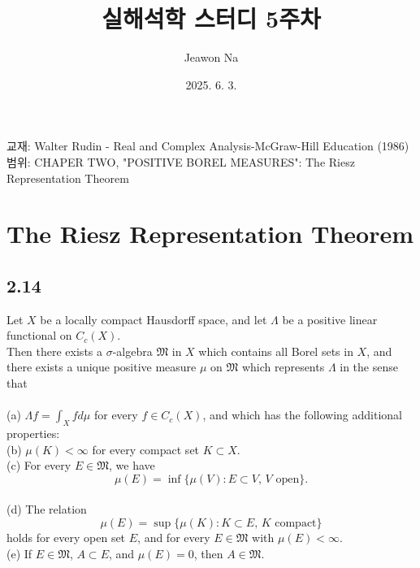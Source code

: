 \documentclass[11pt,reqno]{amsart}
\renewcommand{\(}{\left(}
\renewcommand{\)}{\right)}
\renewcommand{\[}{\left[}
\renewcommand{\]}{\right]}
\newenvironment{textbox}
  {\begin{tcolorbox}[
    colback=gray!10, 
    colframe=gray!50, 
    boxrule=0.5pt,
    fontupper=\normalfont
  ]}
  {\end{tcolorbox}}
\newcommand{\M}{\mathfrak{M}}
\begin{document}
\title[]{실해석학 스터디 5주차}
\author{Jeawon Na}
\date{2025. 6. 3.}

\maketitle

\vspace{0.5em}

교재: Walter Rudin - Real and Complex Analysis-McGraw-Hill Education (1986) \\
범위: CHAPER TWO, "POSITIVE BOREL MEASURES": The Riesz Representation Theorem

\section{The Riesz Representation Theorem}

\subsection{2.14}

\begin{textbox}
  Let $X$ be a locally compact Hausdorff space, and let $\Lambda$ be a positive linear functional on $C_c(X)$. \\
  Then there exists a $\sigma$-algebra $\M$ in $X$ which contains all Borel sets in $X$, 
  and there exists a unique positive measure $\mu$ on $\M$ which represents $\Lambda$ in the sense that \\ \\
  (a) $\Lambda f = \int_X f d \mu$ for every $f \in C_c(X)$, and which has the following additional properties: \\
  (b) $\mu(K) < \infty$ for every compact set $K \subset X$. \\
  (c) For every $E \in \M$, we have 
  \begin{equation*}
    \mu(E) = \inf \{ \mu(V) : E \subset V, \, V \text{ open} \}.
  \end{equation*} \\
  (d) The relation
  \begin{equation*}
    \mu(E) = \sup \{ \mu(K) : K \subset E, \, K \text{ compact} \}
  \end{equation*}
  holds for every open set $E$, and for every $E \in \M$ with $\mu(E) < \infty$. \\
  (e) If $E \in \M$, $A \subset E$, and $\mu(E) = 0$, then $A \in \M$.
\end{textbox}
\end{document}
